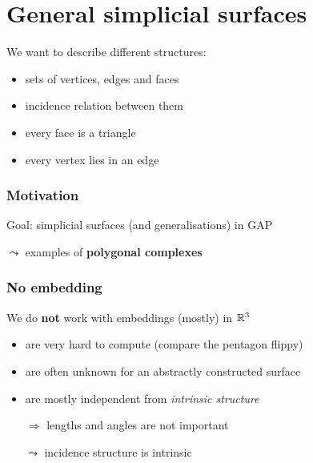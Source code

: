 \section{General simplicial surfaces}
\frame{\tableofcontents[currentsection]}

\begin{frame}{}
    We want to describe different structures:
    \begin{itemize}
        \item<4-> sets of vertices, edges and faces
        \item<5-> incidence relation between them
        \item<6-> every face is a triangle
        \item<7-> every vertex lies in an edge 
    \end{itemize}
\end{frame}

\begin{frame}
    \frametitle{Motivation}
    \pause
    Goal: simplicial surfaces (and generalisations) in GAP
    \pause
    \begin{center}
        
    \end{center}
    \pause
    $\leadsto$ examples of \textbf{polygonal complexes}
\end{frame}

\begin{frame}
    \frametitle{No embedding}
    \pause
    We do \textbf{not} work with embeddings (mostly) in $\mathbb{R}^3$
    \begin{itemize}
        \pause
        \item are very hard to compute \pause (compare the pentagon flippy)
        \pause
        \item are often unknown for an abstractly constructed surface
        \pause
        \item are mostly independent from \textit{intrinsic structure}
        \pause
        \item[$\Rightarrow$] lengths and angles are not important
        \pause
        \item[$\leadsto$] incidence structure is intrinsic
    \end{itemize}
\end{frame}

